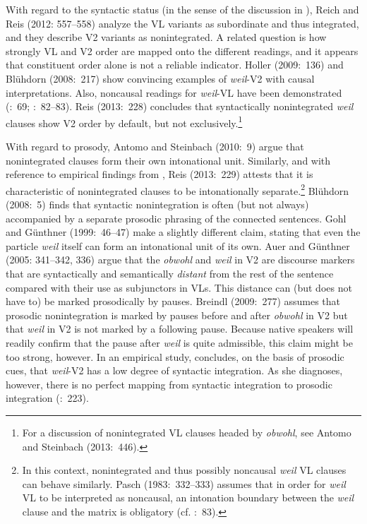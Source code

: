 With regard to the syntactic status (in the sense of the discussion in ), Reich and Reis (2012: 557–558) analyze the VL variants as subordinate and thus integrated, and they describe V2 variants as nonintegrated. A related question is how strongly VL and V2 order are mapped onto the different readings, and it appears that constituent order alone is not a reliable indicator. Holler (2009:~136) and Blühdorn (2008:~217) show convincing examples of \textit{weil}{}-V2 with causal interpretations. Also, noncausal readings for \textit{weil}{}-VL have been demonstrated (\citealt{Wegener2000}:~69; \citealt{Volodina2011}:~82–83). Reis (2013:~228) concludes that syntactically nonintegrated \textit{weil} clauses show V2 order by default, but not exclu\-sively.\footnote{For a discussion of nonintegrated VL clauses headed by \textit{obwohl}, see Antomo and Steinbach (2013:~446).}



With regard to prosody, Antomo and Steinbach (2010:~9) argue that nonintegrated clauses form their own intonational unit. Similarly, and with reference to empirical findings from \citet{Volodina2011}, Reis (2013:~229) attests that it is characteristic of nonintegrated clauses to be intonationally separate.\footnote{In this context, nonintegrated and thus possibly noncausal \textit{weil} VL clauses can behave similarly. Pasch (1983:~332–333) assumes that in order for \textit{weil} VL to be interpreted as noncausal, an intonation boundary between the \textit{weil} clause and the matrix is obligatory (cf. \citealt{Volodina2011}:~83).} Blühdorn (2008:~5) finds that syntactic nonintegration is often (but not always) accompanied by a separate prosodic phrasing of the connected sentences. Gohl and Günthner (1999:~46–47) make a slightly different claim, stating that even the particle \textit{weil} itself can form an intonational unit of its own. Auer and Günthner (2005: 341–342, 336) argue that the \textit{obwohl} and \textit{weil} in V2 are discourse markers that are syntactically and semantically \textit{distant} from the rest of the sentence compared with their use as subjunctors in VLs. This distance can (but does not have to) be marked prosodically by pauses. Breindl (2009:~277) assumes that prosodic nonintegration is marked by pauses before and after \textit{obwohl} in V2 but that \textit{weil} in V2 is not marked by a following pause. Because native speakers will readily confirm that the pause after \textit{weil} is quite admissible, this claim might be too strong, however. In an empirical study, \citet[159]{Volodina2011} concludes, on the basis of prosodic cues, that \textit{weil}{}-V2 has a low degree of syntactic integration. As she diagnoses, however, there is no perfect mapping from syntactic integration to prosodic integration (\citealt{Volodina2011}:~223).



